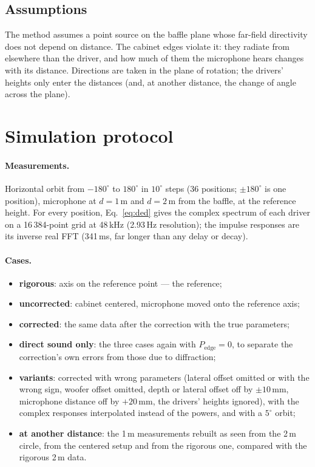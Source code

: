 \documentclass[11pt,a4paper]{article}
\begin{document}
\subsection{Assumptions}

The method assumes a point source on the baffle plane whose far-field directivity does not depend on
distance. The cabinet edges violate it: they radiate from elsewhere than the driver, and how much of
them the microphone hears changes with its distance. Directions are taken in the plane of rotation;
the drivers' heights only enter the distances (and, at another distance, the change of angle across the
plane).

\section{Simulation protocol}

\paragraph{Measurements.} Horizontal orbit from $-180^\circ$ to $180^\circ$ in $10^\circ$ steps
(36 positions; $\pm180^\circ$ is one position), microphone at $d=1$\,m and $d=2$\,m from the baffle, at
the reference height. For every position, Eq.~\eqref{eq:ded} gives the complex spectrum of each driver
on a 16\,384-point grid at 48\,kHz (2.93\,Hz resolution); the impulse responses are its inverse
real FFT (341\,ms, far longer than any delay or decay).

\paragraph{Cases.}
\begin{itemize}
  \item \textbf{rigorous}: axis on the reference point --- the reference;
  \item \textbf{uncorrected}: cabinet centered, microphone moved onto the reference axis;
  \item \textbf{corrected}: the same data after the correction with the true parameters;
  \item \textbf{direct sound only}: the three cases again with $P_\text{edge}=0$, to separate the
  correction's own errors from those due to diffraction;
  \item \textbf{variants}: corrected with wrong parameters (lateral offset omitted or with the wrong
  sign, woofer offset omitted, depth or lateral offset off by $\pm10$\,mm, microphone distance off by
  $+20$\,mm, the drivers' heights ignored), with the complex responses interpolated instead of the
  powers, and with a $5^\circ$ orbit;
  \item \textbf{at another distance}: the 1\,m measurements rebuilt as seen from the 2\,m circle, from the
  centered setup and from the rigorous one, compared with the rigorous 2\,m data.
\end{itemize}
\end{document}

